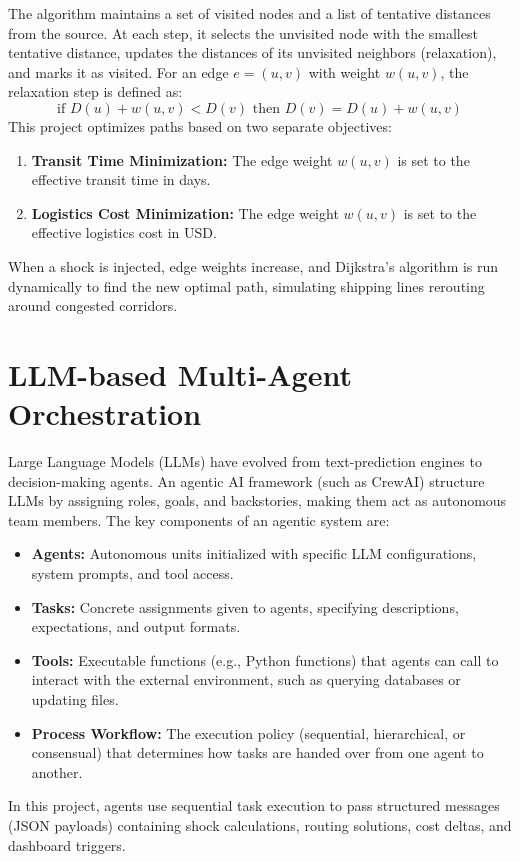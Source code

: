 The algorithm maintains a set of visited nodes and a list of tentative distances from the source. At each step, it selects the unvisited node with the smallest tentative distance, updates the distances of its unvisited neighbors (relaxation), and marks it as visited.
For an edge $e = (u, v)$ with weight $w(u, v)$, the relaxation step is defined as:
\begin{equation}
    \text{if } D(u) + w(u, v) < D(v) \text{ then } D(v) = D(u) + w(u, v)
\end{equation}
This project optimizes paths based on two separate objectives:
\begin{enumerate}
    \item \textbf{Transit Time Minimization:} The edge weight $w(u, v)$ is set to the effective transit time in days.
    \item \textbf{Logistics Cost Minimization:} The edge weight $w(u, v)$ is set to the effective logistics cost in USD.
\end{enumerate}
When a shock is injected, edge weights increase, and Dijkstra's algorithm is run dynamically to find the new optimal path, simulating shipping lines rerouting around congested corridors.

\section{LLM-based Multi-Agent Orchestration}
Large Language Models (LLMs) have evolved from text-prediction engines to decision-making agents. An agentic AI framework (such as CrewAI) structure LLMs by assigning roles, goals, and backstories, making them act as autonomous team members.
The key components of an agentic system are:
\begin{itemize}
    \item \textbf{Agents:} Autonomous units initialized with specific LLM configurations, system prompts, and tool access.
    \item \textbf{Tasks:} Concrete assignments given to agents, specifying descriptions, expectations, and output formats.
    \item \textbf{Tools:} Executable functions (e.g., Python functions) that agents can call to interact with the external environment, such as querying databases or updating files.
    \item \textbf{Process Workflow:} The execution policy (sequential, hierarchical, or consensual) that determines how tasks are handed over from one agent to another.
\end{itemize}
In this project, agents use sequential task execution to pass structured messages (JSON payloads) containing shock calculations, routing solutions, cost deltas, and dashboard triggers.

